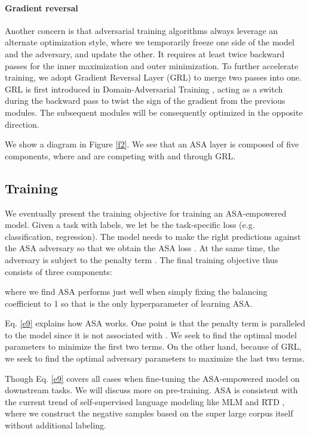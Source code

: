 \documentclass[letterpaper]{article} \usepackage{aaai23}  \usepackage{times}  \usepackage{helvet}  \usepackage{courier}  \usepackage[hyphens]{url}  \usepackage{graphicx} \urlstyle{rm} \def\UrlFont{\rm}  \usepackage{natbib}  \usepackage{caption} \frenchspacing  \setlength{\pdfpagewidth}{8.5in}  \setlength{\pdfpageheight}{11in}  \usepackage{algorithm}
\begin{document}
\paragraph{Gradient reversal} Another concern is that adversarial training algorithms always leverage an alternate optimization style, where we temporarily freeze one side of the model and the adversary, and update the other. It requires at least twice backward passes for the inner maximization and outer minimization. To further accelerate training, we adopt Gradient Reversal Layer (GRL) to merge two passes into one. GRL is first introduced in Domain-Adversarial Training \citep{DBLP:conf/icml/GaninL15}, acting as a switch during the backward pass to twist the sign of the gradient from the previous modules. The subsequent modules will be consequently optimized in the opposite direction.

We show a diagram in Figure \ref{f2}. We see that an ASA layer is composed of five components, where  and  are competing with  and  through GRL.

\subsection{Training}

We eventually present the training objective for training an ASA-empowered model. Given a task with labels, we let  be the task-specific loss (e.g. classification, regression). The model needs to make the right predictions against the ASA adversary so that we obtain the ASA loss . At the same time, the adversary is subject to the penalty term . The final training objective thus consists of three components:

where we find ASA performs just well when simply fixing the balancing coefficient  to 1 so that  is the only hyperparameter of learning ASA.

Eq. \ref{e9} explains how ASA works. One point is that the penalty term is paralleled to the model since it is not associated with . We seek to find the optimal model parameters  to minimize the first two terms. On the other hand, because of GRL, we seek to find the optimal adversary parameters  to maximize the last two terms.

Though Eq. \ref{e9} covers all cases when fine-tuning the ASA-empowered model on downstream tasks. We will discuss more on pre-training. ASA is consistent with the current trend of self-supervised language modeling like MLM \citep{DBLP:conf/naacl/DevlinCLT19} and RTD \citep{DBLP:conf/iclr/ClarkLLM20}, where we construct the negative samples based on the super large corpus itself without additional labeling.
\end{document}
